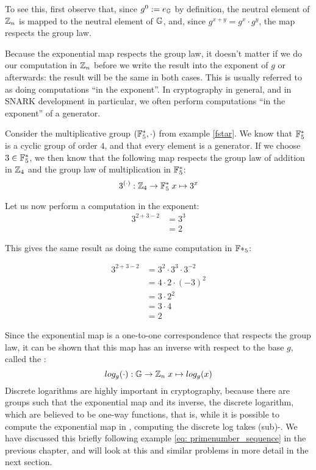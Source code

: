 To see this, first observe that, since $g^0:=e_{\mathbb{G}}$ by definition, the neutral element of $\mathbb{Z}_n$ is mapped to the neutral element of $\mathbb{G}$, and, since $g^{x+y}=g^x\cdot g^y$, the map respects the group law.

Because the exponential map respects the group law, it doesn't matter if we do our computation in $\mathbb{Z}_n$ before we write the result into the exponent of $g$ or afterwards: the result will be the same in both cases. This is usually referred to as doing computations ``in the exponent''. In cryptography in general, and in SNARK development in particular, we often perform computations ``in the exponent'' of a generator.
\begin{example}\label{ex:in-the-exponent} Consider the multiplicative group $(\mathbb{F}_{5}^*,\cdot)$ from example \ref{fstar}. We know that $\mathbb{F}_{5}^*$ is a cyclic group of order $4$, and that every element is a generator. If we choose $3\in\mathbb{F}_5^*$, we then know that the following map respects the group law of addition in $\mathbb{Z}_4$ and the group law of multiplication in $\mathbb{F}_5^*$:
$$
3^{(\cdot)}: \mathbb{Z}_4 \to \mathbb{F}_5^* \; x \mapsto 3^x
$$

Let us now perform a computation in the exponent:
\begin{align*}
3^{2+3-2} &=3^{3}\\
          & = 2
\end{align*}

This gives the same result as doing the same computation in $\mathbb{F}*_5$:

\begin{align*}
3^{2+3-2} &= 3^2 \cdot 3^3 \cdot 3^{-2}\\
          &= 4\cdot 2 \cdot (-3)^2\\
          &= 3\cdot 2^2\\
          &= 3\cdot 4 \\
          &= 2
\end{align*}

\end{example}
Since the exponential map is a one-to-one correspondence that respects the group law, it can be shown that this map has an inverse with respect to the base $g$, called the :
\begin{equation}
log_g(\cdot): \mathbb{G} \to \mathbb{Z}_n\; x \mapsto log_g(x)
\end{equation}
Discrete logarithms are highly important in cryptography, because there are groups such that the exponential map and its inverse, the discrete logarithm, which are believed to be one-way functions, that is, while it is possible to compute the exponential map in , computing the discrete log takes (sub)-. We have discussed this briefly following example \ref{eq: primenumber_sequence} in the previous chapter, and will look at this and similar problems in more detail in the next section.


